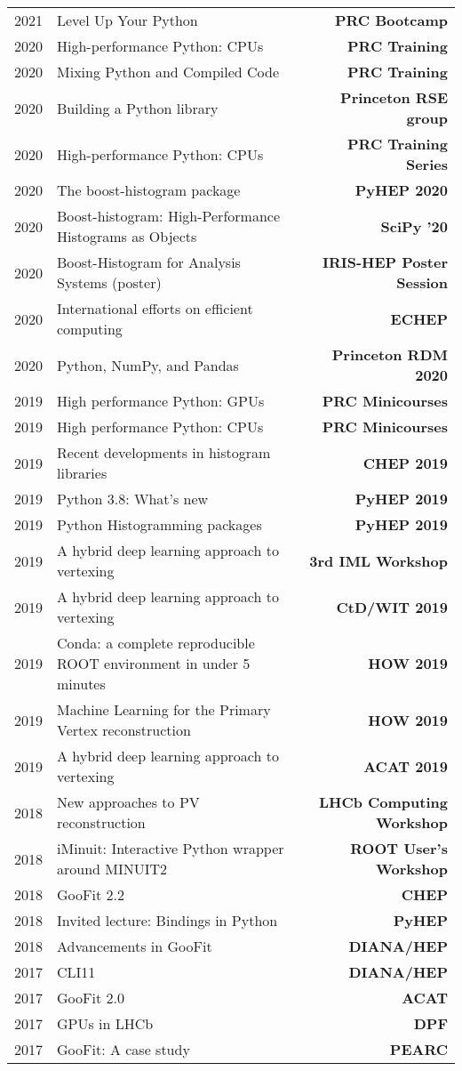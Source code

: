 \documentclass[10pt,letterpaper]{moderncv}
\begin{document}
\begin{tabularx}{\textwidth}{p{.33in}X>{\bfseries}r}
    2021 & Level Up Your Python & PRC Bootcamp \\
    2020 & High-performance Python: CPUs & PRC Training \\
    2020 & Mixing Python and Compiled Code & PRC Training \\
    2020 & Building a Python library & Princeton RSE group \\
    2020 & High-performance Python: CPUs & PRC Training Series \\
    2020 & The boost-histogram package & PyHEP 2020 \\
    2020 & Boost-histogram: High-Performance Histograms as Objects & SciPy '20 \\
    2020 & Boost-Histogram for Analysis Systems (poster) & IRIS-HEP Poster Session \\
    2020 & International efforts on efficient computing & ECHEP \\
    2020 & Python, NumPy, and Pandas & Princeton RDM 2020 \\
    2019 & High performance Python: GPUs & PRC Minicourses \\
    2019 & High performance Python: CPUs & PRC Minicourses \\
    2019 & Recent developments in histogram libraries  & CHEP 2019 \\
    2019 & Python 3.8: What's new & PyHEP 2019 \\
    2019 & Python Histogramming packages & PyHEP 2019\\
    2019 & A hybrid deep learning approach to vertexing & 3rd IML Workshop \\
    2019 & A hybrid deep learning approach to vertexing & CtD/WIT 2019 \\
    2019 & Conda: a complete reproducible ROOT environment in under 5 minutes & HOW 2019 \\
    2019 & Machine Learning for the Primary Vertex reconstruction & HOW 2019 \\
    2019 & A hybrid deep learning approach to vertexing & ACAT 2019 \\ %
	2018 & New approaches to PV reconstruction & LHCb Computing Workshop \\ %
	2018 & iMinuit: Interactive Python wrapper around MINUIT2 & ROOT User's Workshop \\  %
	2018 & GooFit 2.2 & CHEP \\ %
	2018 & Invited lecture: Bindings in Python & PyHEP  \\
    2018 & Advancements in GooFit & DIANA/HEP \\
	2017 & CLI11 & DIANA/HEP \\
	2017 & GooFit 2.0 & ACAT \\
	2017 & GPUs in LHCb & DPF \\ %
	2017 & GooFit: A case study & PEARC \\
\end{tabularx}
\end{document}
